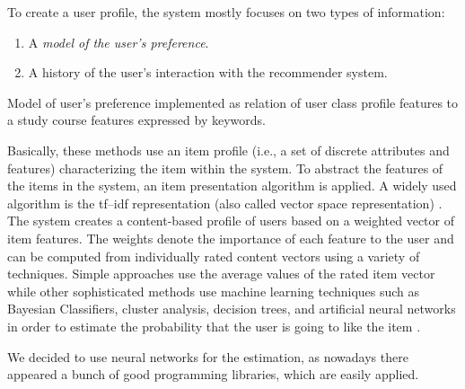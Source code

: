 \documentclass[conference]{IEEEtran}
\begin{document}
{\footnotesize
To create a user profile, the system mostly focuses on two types of information:
\begin{enumerate}
\item A \emph{model of the user's preference}.
\item A history of the user's interaction with the recommender system.
\end{enumerate}
}

Model of user's preference implemented as relation of user class profile features to a study course features expressed by keywords.

{\footnotesize
Basically, these methods use an item profile (i.e., a set of discrete attributes and features) characterizing the item within the system. To abstract the features of the items in the system, an item presentation algorithm is applied. A widely used algorithm is the tf–idf representation (also called vector space representation) \cite{wb43}. The system creates a content-based profile of users based on a weighted vector of item features. The weights denote the importance of each feature to the user and can be computed from individually rated content vectors using a variety of techniques. Simple approaches use the average values of the rated item vector while other sophisticated methods use machine learning techniques such as Bayesian Classifiers, cluster analysis, decision trees, and artificial neural networks in order to estimate the probability that the user is going to like the item \cite{wb44}.
}

We decided to use neural networks for the estimation, as nowadays there appeared a bunch of good programming libraries, which are easily applied.

\end{document}
